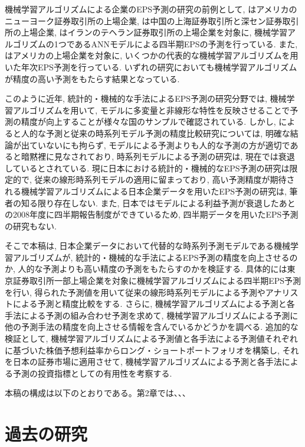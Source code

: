 \documentclass[a4paper, 12pt]{jsreport}
\begin{document}
機械学習アルゴリズムによる企業のEPS予測の研究の前例として, \cite{zhang2004neural}はアメリカのニューヨーク証券取引所の上場企業, \cite*{cao2009forecasting} は中国の上海証券取引所と深セン証券取引所の上場企業, \cite{etemadi2015earnings}はイランのテヘラン証券取引所の上場企業を対象に, 機械学習アルゴリズムの1つであるANNモデルによる四半期EPSの予測を行っている. また, \cite*{cao2020fundamental}はアメリカの上場企業を対象に, いくつかの代表的な機械学習アルゴリズムを用いた年次EPS予測を行っている. いずれの研究においても機械学習アルゴリズムが精度の高い予測をもたらす結果となっている. 

このように近年, 統計的・機械的な手法によるEPS予測の研究分野では, 機械学習アルゴリズムを用いて, モデルに多変量と非線形な特性を反映させることで予測の精度が向上することが様々な国のサンプルで確認されている. しかし, \cite{ota2006}によると人的な予測と従来の時系列モデル予測の精度比較研究については, 明確な結論が出ていないにも拘らず, モデルによる予測よりも人的な予測の方が適切であると暗黙裡に見なされており, 時系列モデルによる予測の研究は, 現在では衰退しているとされている. 現に日本における統計的・機械的なEPS予測の研究は限定的で, 従来の線形時系列モデルの適用に留まっており, 高い予測精度が期待される機械学習アルゴリズムによる日本企業データを用いたEPS予測の研究は, 筆者の知る限り存在しない. また, 日本ではモデルによる利益予測が衰退したあとの2008年度に四半期報告制度ができているため, 四半期データを用いたEPS予測の研究もない. 

そこで本稿は, 日本企業データにおいて代替的な時系列予測モデルである機械学習アルゴリズムが, 統計的・機械的な手法によるEPS予測の精度を向上させるのか, 人的な予測よりも高い精度の予測をもたらすのかを検証する. 具体的には東京証券取引所一部上場企業を対象に機械学習アルゴリズムによる四半期EPS予測を行い, 得られた予測値を用いて従来の線形時系列モデルによる予測やアナリストによる予測と精度比較をする. さらに, 機械学習アルゴリズムによる予測と各手法による予測の組み合わせ予測\citep*{bates1969combination}を求めて, 機械学習アルゴリズムによる予測に他の予測手法の精度を向上させる情報を含んでいるかどうかを調べる. 追加的な検証として, 機械学習アルゴリズムによる予測値と各手法による予測値それぞれに基づいた株価予想利益率からロング・ショートポートフォリオを構築し, それを日本の証券市場に適用させて, 機械学習アルゴリズムによる予測と各手法による予測の投資指標としての有用性を考察する. 

本稿の構成は以下のとおりである。第2章では、、、

\chapter{過去の研究}
\end{document}
